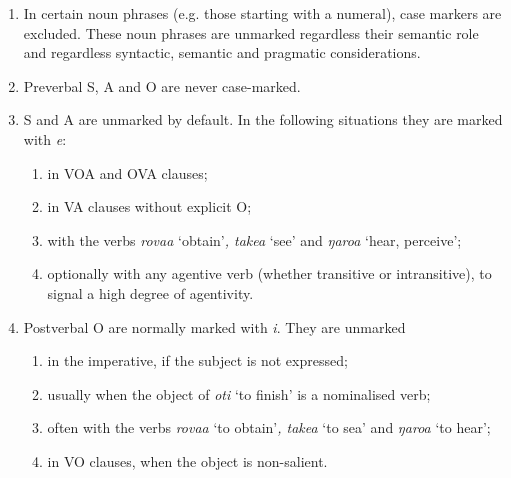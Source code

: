 \begin{enumerate}
\item 
In certain noun phrases (e.g. those starting with a numeral), case markers are excluded. These noun phrases are unmarked regardless their semantic role and regardless syntactic, semantic and pragmatic considerations.

\item 
Preverbal S, A and O are never case-marked.

\item 
S and A are unmarked by default. In the following situations they are marked with \textit{e}:

\begin{enumerate}
\item 
in VOA and OVA clauses;

\item 
in VA clauses without explicit O;

\item 
with the verbs \textit{rova{\ꞌ}a} ‘obtain’\textit{, take{\ꞌ}a} ‘see’ and \textit{ŋaro{\ꞌ}a} ‘hear, perceive’;

\item 
optionally with any agentive verb (whether transitive or intransitive), to signal a high degree of agentivity.

\end{enumerate}
\item 
Postverbal O are normally marked with \textit{i}. They are unmarked

\begin{enumerate}
\item 
in the imperative, if the subject is not expressed;

\item 
usually when the object of \textit{oti} ‘to finish’ is a nominalised verb;

\item 
often with the verbs \textit{rova{\ꞌ}a} ‘to obtain’\textit{, take{\ꞌ}a} ‘to sea’ and \textit{ŋaro{\ꞌ}a} ‘to hear’; 

\item 
in VO clauses, when the object is non-salient.

\end{enumerate}
\end{enumerate}
